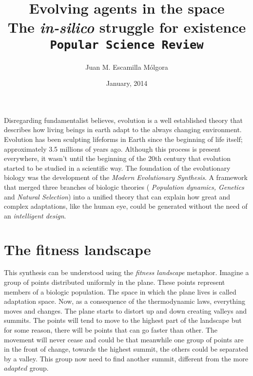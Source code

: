 \documentclass{article}
\title{Evolving agents in the space\\ The {\em in-silico} struggle for existence \\ {\tt Popular Science Review}}
\author{Juan M. Escamilla M\'olgora}
\date{January, 2014}
\begin{document}
\maketitle
%
%
Disregarding fundamentalist believes, evolution is a well established theory that describes how living beings in earth adapt to the always changing environment. Evolution has been sculpting lifeforms in Earth since the beginning of life itself; approximately 3.5 millions of years ago.
Although this process is present everywhere, it wasn't until the beginning of the 20th century that evolution started to be studied in a scientific way. The foundation of the evolutionary biology was the development of the {\em Modern Evolutionary Synthesis}. A framework that merged three branches of biologic theories ( {\em Population dynamics, Genetics} and {\em Natural Selection}) into a unified theory that can explain how great and complex adaptations, like the human eye, could be generated without the need of an {\em intelligent design}. 


\section{The fitness landscape}
This synthesis can be understood using the {\em fitness landscape} metaphor. 
Imagine a group of points distributed uniformly in the plane. These points represent members of a biologic population. The  space in which the plane lives is called adaptation space. Now, as a consequence of the thermodynamic laws, everything moves and changes. The plane starts to distort up and down creating valleys and summits. The points will tend to move to the highest part of the landscape but for some reason, there will be points that can go faster than other. The movement will never cease and could be that meanwhile one group of points are in the front of change, towards the highest summit, the others could be separated by a valley. This group now need to find another summit, different from the more $adapted$ group.
\end{document}
